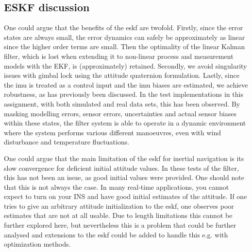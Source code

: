 
\subsection{ESKF discussion}

One could argue that the benefits of the \acrshort{eskf} are twofold. Firstly, since the error states are always small, the error dynamics can safely be approximately as linear since the higher order terms are small. Then the optimality of the linear Kalman filter, which is lost when extending it to non-linear process and measurement models with the EKF, is (approximately) retained. Secondly, we avoid singularity issues with gimbal lock using the attitude quaternion formulation. Lastly, since the \acrshort{imu} is treated as a control input and the \acrshort{imu} biases are estimated, we achieve robustness, as has previously been discussed. In the test implementations in this assignment, with both simulated and real data sets, this has been observed. By masking modelling errors, sensor errors, uncertainties and actual sensor biases within these states, the filter system is able to operate in a dynamic environment where the system performs various different manoeuvres, even with wind disturbance and temperature fluctuations.

One could argue that the main limitation of the \acrshort{eskf} for inertial navigation is its slow convergence for deficient initial attitude values. In these tests of the filter, this has not been an issue, as good initial values were provided. One should note that this is not always the case. In many real-time applications, you cannot expect to turn on your INS and have good initial estimates of the attitude. If one tries to give an arbitrary attitude initialization to the \acrshort{eskf}, one observes poor estimates that are not at all usable. Due to length limitations this cannot be further explored here, but nevertheless this is a problem that could be further analysed and extensions to the \acrshort{eskf} could be added to handle this e.g. with optimization methods.